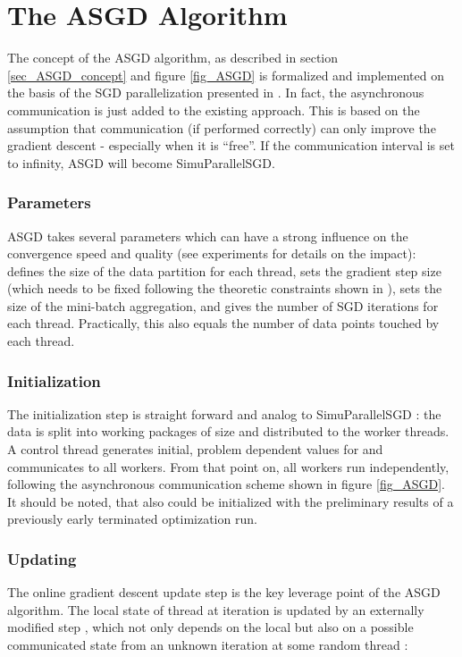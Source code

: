 \documentclass{acm_proc_article-sp}
\begin{document}
\section{The ASGD Algorithm} \label{sec_asgd} 
The concept of the ASGD algorithm, as described in section \ref{sec_ASGD_concept} 
and figure \ref{fig_ASGD} is formalized and implemented on the basis of the SGD 
parallelization presented in \cite{SGDsmola}. In fact, the asynchronous communication is 
just added to the existing approach. This is based on the assumption that communication 
(if performed correctly) can only improve the gradient descent - especially when it 
is ``free''. If the communication interval is set to infinity, ASGD will become 
SimuParallelSGD.    
\subsubsection*{Parameters}
ASGD takes several parameters which can have a strong influence on the convergence 
speed and quality (see experiments for details on the impact):\\
 defines the size of the data partition for each thread,
 sets the gradient step size (which needs to be fixed following
the theoretic constraints shown in \cite{SGDsmola}),
 sets the size of the  mini-batch aggregation, and
 gives the number of SGD iterations for each thread. Practically, this also equals the number 
of data points touched by each thread.

\subsubsection*{Initialization} 
The initialization step is straight forward and analog to SimuParallelSGD \cite{SGDsmola}
: the data is split into working packages of size  and distributed to the 
worker threads. A control thread generates initial, problem dependent values for 
and communicates  to all workers. From that point on, all workers run 
independently, following the asynchronous communication scheme shown in figure
\ref{fig_ASGD}.\\
It should be noted, that  also could be initialized with the 
preliminary results of a previously early terminated optimization run.      

\subsubsection*{Updating}
The online gradient descent update step is the key leverage point of the ASGD 
algorithm. The local state  of thread  at iteration  is updated 
by an externally modified step , which not
only depends on the local  but also on a possible
communicated state  from an unknown iteration  at some random thread :   
\end{document}
